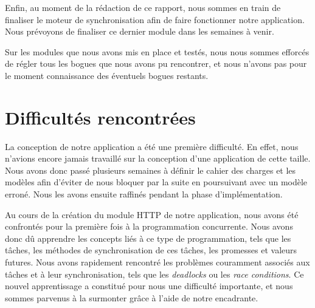Enfin, au moment de la rédaction de ce rapport, nous sommes en train de finaliser le moteur de synchronisation afin de faire fonctionner notre application. Nous prévoyons de finaliser ce dernier module dans les semaines à venir.

Sur les modules que nous avons mis en place et testés, nous nous sommes efforcés de régler tous les bogues que nous avons pu rencontrer, et nous n'avons pas pour le moment connaissance des éventuels bogues restants.

\section{Difficultés rencontrées}

La conception de notre application a été une première difficulté. En effet, nous n'avions encore jamais travaillé sur la conception d'une application de cette taille. Nous avons donc passé plusieurs semaines à définir le cahier des charges et les modèles afin d'éviter de nous bloquer par la suite en poursuivant avec un modèle erroné. Nous les avons ensuite raffinés pendant la phase d'implémentation.

Au cours de la création du module HTTP de notre application, nous avons été confrontés pour la première fois à la programmation concurrente. Nous avons donc dû apprendre les concepts liés à ce type de programmation, tels que les tâches, les méthodes de synchronisation de ces tâches, les promesses et valeurs futures. Nous avons rapidement rencontré les problèmes couramment associés aux tâches et à leur synchronisation, tels que les \emph{deadlocks} ou les \emph{race conditions}. Ce nouvel apprentissage a constitué pour nous une difficulté importante, et nous sommes parvenus à la surmonter grâce à l'aide de notre encadrante.
